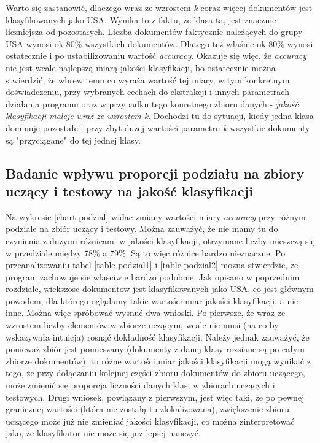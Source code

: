 \documentclass{classrep}
\begin{document}
{{            Warto się zastanowić, dlaczego wraz ze wzrostem \emph{k} coraz więcej dokumentów
            jest klasyfikowanych jako USA. Wynika to z faktu, że klasa ta, jest znacznie liczniejsza
            od pozostałych. Liczba dokumentów faktycznie należących do grupy USA wynosi ok 80\%
            wszystkich dokumentów. Dlatego też właśnie ok 80\% wynosi ostatecznie i po
            ustabilizowaniu wartość \emph{accuracy}. Okazuje się więc, że \emph{accuracy} nie jest
            wcale najlepszą miarą jakości klasyfikacji, bo ostatecznie można stwierdzić, że wbrew
            temu co wyraża wartość tej miary, w tym konkretnym doświadczeniu, przy wybranych cechach
            do ekstrakcji i innych parametrach działania programu oraz w przypadku tego konretnego
            zbioru danych - \emph{jakość klasyfikacji maleje wraz ze wzrostem \emph{k}}. Dochodzi
            tu do sytuacji, kiedy jedna klasa dominuje pozostałe i przy zbyt dużej wartości
            parametru \emph{k} wszystkie dokumenty są "przyciągane" do tej jednej klasy.
        }

        \subsection{Badanie wpływu proporcji podziału na zbiory uczący i testowy na jakość klasyfikacji} \label{exper-test-set} {
            Na wykresie \ref{chart-podzial} widac zmiany wartości miary \emph{accuracy} przy różnym
            podziale na zbiór uczący i testowy. Można zauważyć, że nie mamy tu do czynienia z dużymi
            różnicami w jakości klasyfikacji, otrzymane liczby mieszczą się w przedziale między 78\%
            a 79\%. Są to więc różnice bardzo nieznaczne. Po przeanalizowaniu tabel
            \ref{table-podzial1} i \ref{table-podzial2} mozna stwierdzic, ze program zachowuje sie
            wlasciwie bardzo podobnie. Jak opisano w poprzednim rozdziale, wiekszosc dokumentow jest
            klasyfikowanych jako USA, co jest głównym powodem, dla którego oglądamy takie wartości
            miar jakości klasyfikacji, a nie inne. Można więc spróbować wysnuć dwa wnioski. Po
            pierwsze, że wraz ze wzrostem liczby elementów w zbiorze uczącym, wcale nie musi (na co
            by wskazywała intuicja) rosnąć dokładność klasyfikacji. Należy jednak zauważyć, że
            ponieważ zbiór jest pomieszany (dokumenty z danej klasy rozsiane są po całym zbiorze
            dokumentów), to różne wartości miar jakości klasyfikacji mogą wynikać z tego, że przy
            dołączaniu kolejnej części zbioru dokumentów do zbioru uczącego, może zmienić się
            proporcja liczności danych klas, w zbiorach uczących i testowych. Drugi wniosek,
            powiązany z pierwszym, jest więc taki, że po pewnej granicznej wartości (która nie
            zostałą tu zlokalizowana), zwiększenie zbioru uczącego może już nie zmieniać jakości
            klasyfikacji, co można zinterpretować jako, że klasyfikator nie może się już lepiej
            nauczyć.
        }

}
\end{document}
